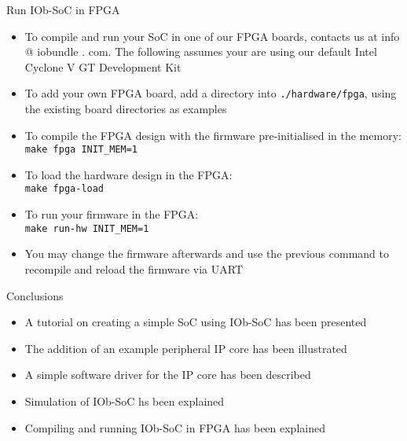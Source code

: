 \documentclass [xcolor=svgnames, t] {beamer}
\begin{document}
\begin{frame}{Run IOb-SoC in FPGA}
\begin{itemize}
\item To compile and run your SoC in one of our FPGA boards, contacts us at info
  @ iobundle . com. The following assumes your are using our default Intel
  Cyclone V GT Development Kit
\item To add your own FPGA board, add a directory into {\tt ./hardware/fpga},
  using the existing board directories as examples
\item To compile the FPGA design with the firmware pre-initialised in the memory:\\
  {\tt make fpga INIT\_MEM=1}
\item To load the hardware design in the FPGA:\\
  {\tt make fpga-load}
\item To run your firmware in the FPGA:\\
  {\tt make run-hw INIT\_MEM=1}
\item You may change the firmware afterwards and use the previous command to
  recompile and reload the firmware via UART
\end{itemize}
\end{frame}

\begin{frame}{Conclusions}  
  \begin{itemize}
  \item A tutorial on creating a simple SoC using IOb-SoC has been presented
  \item The addition of an example peripheral IP core has been illustrated
  \item A simple software driver for the IP core has been described
  \item Simulation of IOb-SoC hs been explained
  \item Compiling and running IOb-SoC in FPGA has been explained
  \end{itemize}
\end{frame}

\end{document}
